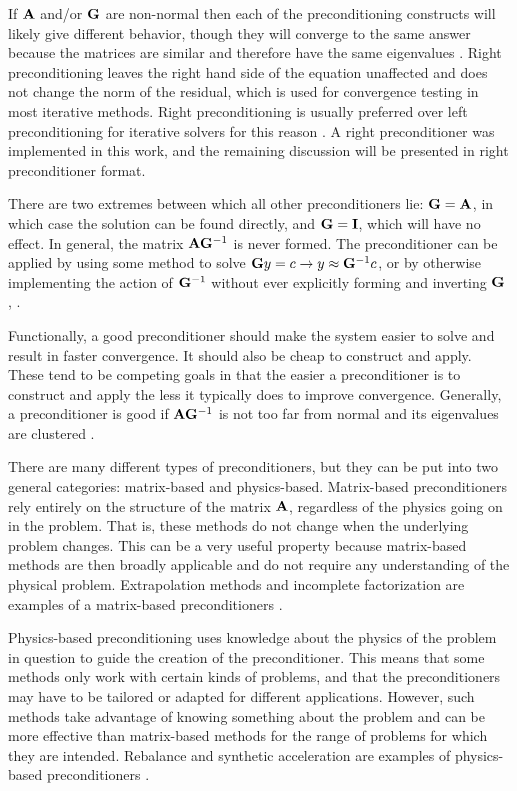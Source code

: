 If $\mathbf{A}$ and/or $\mathbf{G}$ are non-normal then each of the preconditioning constructs will likely give different behavior, though they will converge to the same answer because the matrices are similar and therefore have the same eigenvalues  \cite{Benzi2002}. Right preconditioning leaves the right hand side of the equation unaffected and does not change the norm of the residual, which is used for convergence testing in most iterative methods. Right preconditioning is usually preferred over left preconditioning for iterative solvers for this reason \cite{Knoll2004}. A right preconditioner was implemented in this work, and the remaining discussion will be presented in right preconditioner format. 

There are two extremes between which all other preconditioners lie: $\mathbf{G} = \mathbf{A}$, in which case the solution can be found directly, and $\mathbf{G} = \mathbf{I}$, which will have no effect.  In general, the matrix $\mathbf{A}\mathbf{G}^{-1}$ is never formed. The preconditioner can be applied by using some method to solve $\mathbf{G}y=c \to y \approx \mathbf{G}^{-1}c$, or by otherwise implementing the action of $\mathbf{G}^{-1}$ without ever explicitly forming and inverting $\mathbf{G}$ \cite{Benzi2002}, \cite{Trefethen1997}. 

Functionally, a good preconditioner should make the system easier to solve and result in faster convergence. It should also be cheap to construct and apply. These tend to be competing goals in that the easier a preconditioner is to construct and apply the less it typically does to improve convergence. Generally, a preconditioner is good if $\mathbf{A}\mathbf{G}^{-1}$ is not too far from normal and its eigenvalues are clustered \cite{Trefethen1997}. 

There are many different types of preconditioners, but they can be put into two general categories: matrix-based and physics-based. Matrix-based preconditioners rely entirely on the structure of the matrix $\mathbf{A}$, regardless of the physics going on in the problem. That is, these methods do not change when the underlying problem changes. This can be a very useful property because matrix-based methods are then broadly applicable and do not require any understanding of the physical problem. Extrapolation methods and incomplete factorization are examples of a matrix-based preconditioners \cite{Trefethen1997}.

Physics-based preconditioning uses knowledge about the physics of the problem in question to guide the creation of the preconditioner. This means that some methods only work with certain kinds of problems, and that the preconditioners may have to be tailored or adapted for different applications. However, such methods take advantage of knowing something about the problem and can be more effective than matrix-based methods for the range of problems for which they are intended. Rebalance and synthetic acceleration are examples of physics-based preconditioners \cite{Trefethen1997}.

